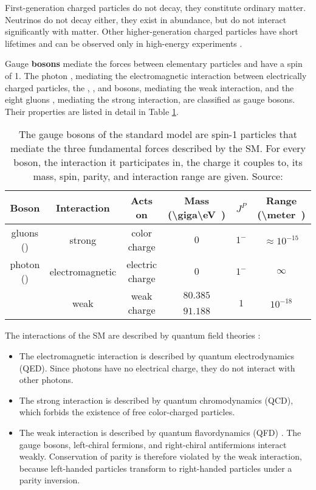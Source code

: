 First-generation charged particles do not decay, they constitute ordinary matter. Neutrinos do not decay either, they exist in abundance, but do not interact significantly with matter. Other higher-generation charged particles have short lifetimes and can be observed only in high-energy experiments \cite{wiki:standardmodel}.

Gauge \textbf{bosons} mediate the forces between elementary particles and have a spin of 1. The photon \Pphoton, mediating the electromagnetic interaction between electrically charged particles, the \PWplus, \PWminus, and \PZ bosons, mediating the weak interaction, and the eight gluons \Pgluon, mediating the strong interaction, are classified as gauge bosons. Their properties are listed in detail in Table \ref{tab:ch_1_sm_bosons}.

\begin{table}[h]
	\caption[Gauge bosons of the SM]{The gauge bosons of the standard model are spin-1 particles that mediate the three fundamental forces described by the SM. For every boson, the interaction it participates in, the charge it couples to, its mass, spin, parity, and interaction range are given. Source: \cite{Pov14, Fal18, pdg}}
	\label{tab:ch_1_sm_bosons}
	\begin{center}
    	\begin{tabular}{cccccc}
    		\toprule
    		Boson & Interaction & Acts on & Mass (\SI[parse-numbers = false]{\giga\eV}) & {$J^P$} & Range (\SI[parse-numbers = false]{\meter})\\
    		\midrule
    		gluons (\Pgluon) & strong & color charge & {$0$} & {$1^-$} & $\approx 10^{-15}$\\
    		photon (\Pphoton) & electromagnetic & electric charge & {$0$} & {$1^-$} & {$\infty$}\\
    		\PWpm & \multirow{2}{*}{weak} &\multirow{2}{*}{weak charge} & {$80.385$} & \multirow{2}{*}{$1$} & \multirow{2}{*}{$10^{-18}$}\\
    		\PZzero & & & {$91.188$} & &\\
    		\bottomrule
    	\end{tabular}
	\end{center}
\end{table}

The interactions of the SM are described by quantum field theories \cite{Pov14}:
\begin{itemize}
\item The electromagnetic interaction is described by quantum electrodynamics (QED). Since photons have no electrical charge, they do not interact with other photons.
\item The strong interaction is described by quantum chromodynamics (QCD), which forbids the existence of free color-charged particles.
\item The weak interaction is described by quantum flavordynamics (QFD) \cite{Gri08}. The gauge bosons, left-chiral fermions, and right-chiral antifermions interact weakly. Conservation of parity is therefore violated by the weak interaction, because left-handed particles transform to right-handed particles under a parity inversion.
\end{itemize}

